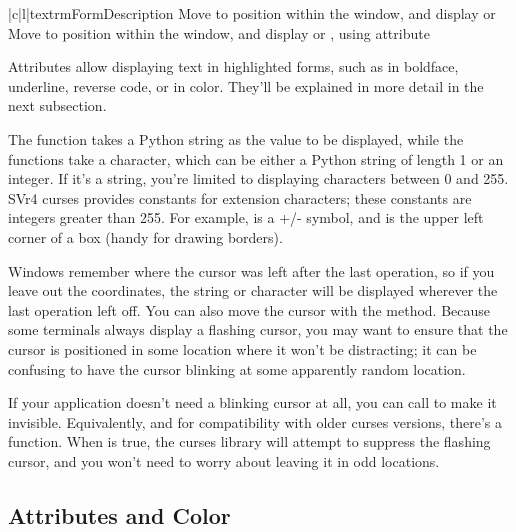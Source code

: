 \documentclass{howto}
\begin{document}
\begin{tableii}{|c|l|}{textrm}{Form}{Description}
{Move to position  within the window, and display 
or }
{Move to position  within the window, and display 
or , using attribute }
\end{tableii}

Attributes allow displaying text in highlighted forms, such as in
boldface, underline, reverse code, or in color.  They'll be explained
in more detail in the next subsection.

The  function takes a Python string as the value to
be displayed, while the  functions take a character,
which can be either a Python string of length 1 or an integer.  If
it's a string, you're limited to displaying characters between 0 and
255.  SVr4 curses provides constants for extension characters; these
constants are integers greater than 255.  For example,
 is a +/- symbol, and  is
the upper left corner of a box (handy for drawing borders).

Windows remember where the cursor was left after the last operation,
so if you leave out the  coordinates, the string or character
will be displayed wherever the last operation left off.  You can also
move the cursor with the  method.  Because
some terminals always display a flashing cursor, you may want to
ensure that the cursor is positioned in some location where it won't
be distracting; it can be confusing to have the cursor blinking at
some apparently random location.  

If your application doesn't need a blinking cursor at all, you can
call  to make it invisible.  Equivalently, and
for compatibility with older curses versions, there's a
 function.  When  is true, the
curses library will attempt to suppress the flashing cursor, and you
won't need to worry about leaving it in odd locations.

\subsection{Attributes and Color}
\end{document}
